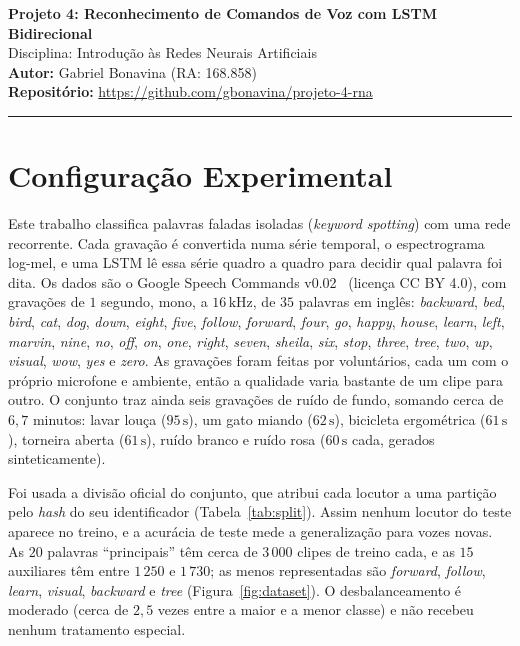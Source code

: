 \documentclass[11pt,a4paper]{article}
\newcommand{\w}[1]{\textit{#1}}
\begin{document}
\begin{center}
    {\LARGE \textbf{Projeto 4: Reconhecimento de Comandos de Voz com LSTM Bidirecional}} \\[0.35em]
    {\large Disciplina: Introdução às Redes Neurais Artificiais} \\[0.3em]
    \textbf{Autor:} Gabriel Bonavina (RA: 168.858)\\[0.2em]
    \textbf{Repositório:} \url{https://github.com/gbonavina/projeto-4-rna}
\end{center}
\vspace{-0.5em}
\hrule
\vspace{0.8em}

\section*{Configuração Experimental}

Este trabalho classifica palavras faladas isoladas (\textit{keyword spotting}) com uma rede recorrente. Cada gravação é convertida numa série temporal, o espectrograma log-mel, e uma LSTM lê essa série quadro a quadro para decidir qual palavra foi dita. Os dados são o Google Speech Commands v0.02~\cite{warden2018} (licença CC BY 4.0), com gravações de $1$ segundo, mono, a $16\,\mathrm{kHz}$, de $35$ palavras em inglês: \w{backward}, \w{bed}, \w{bird}, \w{cat}, \w{dog}, \w{down}, \w{eight}, \w{five}, \w{follow}, \w{forward}, \w{four}, \w{go}, \w{happy}, \w{house}, \w{learn}, \w{left}, \w{marvin}, \w{nine}, \w{no}, \w{off}, \w{on}, \w{one}, \w{right}, \w{seven}, \w{sheila}, \w{six}, \w{stop}, \w{three}, \w{tree}, \w{two}, \w{up}, \w{visual}, \w{wow}, \w{yes} e \w{zero}. As gravações foram feitas por voluntários, cada um com o próprio microfone e ambiente, então a qualidade varia bastante de um clipe para outro. O conjunto traz ainda seis gravações de ruído de fundo, somando cerca de $6{,}7$ minutos: lavar louça ($95\,\mathrm{s}$), um gato miando ($62\,\mathrm{s}$), bicicleta ergométrica ($61\,\mathrm{s}$), torneira aberta ($61\,\mathrm{s}$), ruído branco e ruído rosa ($60\,\mathrm{s}$ cada, gerados sinteticamente).

Foi usada a divisão oficial do conjunto, que atribui cada locutor a uma partição pelo \textit{hash} do seu identificador (Tabela~\ref{tab:split}). Assim nenhum locutor do teste aparece no treino, e a acurácia de teste mede a generalização para vozes novas. As $20$ palavras ``principais'' têm cerca de $3\,000$ clipes de treino cada, e as $15$ auxiliares têm entre $1\,250$ e $1\,730$; as menos representadas são \w{forward}, \w{follow}, \w{learn}, \w{visual}, \w{backward} e \w{tree} (Figura~\ref{fig:dataset}). O desbalanceamento é moderado (cerca de $2{,}5$ vezes entre a maior e a menor classe) e não recebeu nenhum tratamento especial.
\end{document}
